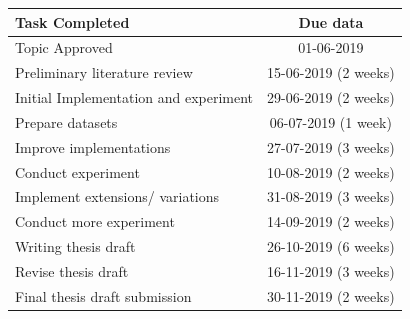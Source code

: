 \documentclass[runningheads]{llncs}
\begin{document}
	\begin{table}
		\centering
		\begin{tabular}{| l | c | }
			\hline
			Task Completed & Due data\\
			\hline
			Topic Approved & 01-06-2019  \\
			Preliminary literature review & 15-06-2019 (2 weeks) \\
			Initial Implementation and experiment & 29-06-2019 (2 weeks) \\
			Prepare datasets & 06-07-2019  (1 week) \\
			Improve implementations & 27-07-2019 (3 weeks) \\
			Conduct experiment & 10-08-2019 (2 weeks) \\
			Implement extensions/ variations & 31-08-2019 (3 weeks) \\
			Conduct more experiment & 14-09-2019 (2 weeks) \\
			Writing thesis draft & 26-10-2019 (6 weeks) \\
			Revise thesis draft & 16-11-2019 (3 weeks) \\
			Final thesis draft submission & 30-11-2019 (2 weeks) \\
			\hline
		\end{tabular}
		
	\end{table}
	
	

	\newpage
	
	
	
	
\end{document}
